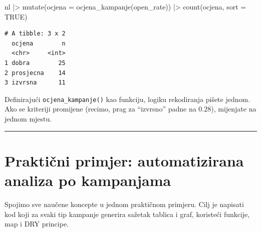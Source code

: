 \documentclass[
  croatian,
  letterpaper,
  DIV=11,
  numbers=noendperiod]{scrartcl}
\newenvironment{Shaded}{\begin{snugshade}}{\end{snugshade}}
\newcommand{\AttributeTok}[1]{\textcolor[rgb]{0.40,0.45,0.13}{#1}}
\newcommand{\ConstantTok}[1]{\textcolor[rgb]{0.56,0.35,0.01}{#1}}
\newcommand{\FunctionTok}[1]{\textcolor[rgb]{0.28,0.35,0.67}{#1}}
\newcommand{\NormalTok}[1]{\textcolor[rgb]{0.00,0.23,0.31}{#1}}
\newcommand{\SpecialCharTok}[1]{\textcolor[rgb]{0.37,0.37,0.37}{#1}}
\begin{document}
\begin{Shaded}
\begin{Highlighting}[]
\NormalTok{nl }\SpecialCharTok{|\textgreater{}}
  \FunctionTok{mutate}\NormalTok{(}\AttributeTok{ocjena =} \FunctionTok{ocjena\_kampanje}\NormalTok{(open\_rate)) }\SpecialCharTok{|\textgreater{}}
  \FunctionTok{count}\NormalTok{(ocjena, }\AttributeTok{sort =} \ConstantTok{TRUE}\NormalTok{)}
\end{Highlighting}
\end{Shaded}

\begin{verbatim}
# A tibble: 3 x 2
  ocjena        n
  <chr>     <int>
1 dobra        25
2 prosjecna    14
3 izvrsna      11
\end{verbatim}

Definirajući \texttt{ocjena\_kampanje()} kao funkciju, logiku
rekodiranja pišete jednom. Ako se kriteriji promijene (recimo, prag za
``izvrsno'' padne na 0.28), mijenjate na jednom mjestu.

\begin{center}\rule{0.5\linewidth}{0.5pt}\end{center}

\section{Praktični primjer: automatizirana analiza po
kampanjama}\label{sec-prakticni-primjer}

Spojimo sve naučene koncepte u jednom praktičnom primjeru. Cilj je
napisati kod koji za svaki tip kampanje generira sažetak tablica i graf,
koristeći funkcije, map i DRY principe.
\end{document}
